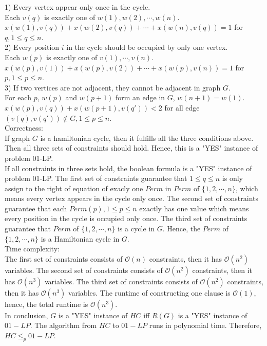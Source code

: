 \documentclass[12pt,letterpaper]{article}
\begin{document}
1) Every vertex appear only once in the cycle. \\
Each $v(q)$ is exactly one of $w(1), w(2), \cdots, w(n)$. \\
$x(w(1),v(q)) + x(w(2),v(q)) + \cdots + x(w(n),v(q)) = 1$ for $q, 1 \le q \le n$. \\
2) Every position $i$ in the cycle should be occupied by only one vertex. \\
Each $w(p)$ is exactly one of $v(1), \cdots, v(n)$. \\
$x(w(p),v(1)) + x(w(p),v(2)) + \cdots + x(w(p),v(n)) = 1$ for $p, 1 \le p \le n$. \\
3) If two vertices are not adjacent, they cannot be adjacent in graph $G$. \\
For each $p$, $w(p)$ and $w(p+1)$ form an edge in $G$, $w(n+1) = w(1)$. \\
$x(w(p),v(q)) + x(w(p+1),v(q')) < 2$ for all edge $(v(q),v(q')) \notin G, 1 \le p \le n$. \\
Correctness: \\
If graph $G$ is a hamiltonian cycle, then it fulfills all the three conditions above.
Then all three sets of constraints should hold.
Hence, this is a "YES" instance of problem 01-LP. \\
If all constraints in three sets hold, the boolean formula is a "YES" instance of problem 01-LP.
The first set of constraints guarantee that $1 \le q \le n$
is only assign to the right of equation of exacly one $Perm$ in $Perm$ of $\{1,2,\cdots,n\}$,
which means every vertex appears in the cycle only once.
The second set of constraints guarantee that each
$Perm(p), 1 \le p \le n$ exactly has one value which means every position in the cycle is occupied only once.
The third set of constraints guarantee that $Perm$ of $\{1,2,\cdots,n\}$ is a cycle in $G$.
Hence, the $Perm$ of $\{1,2,\cdots,n\}$ is a Hamiltonian cycle in $G$. \\
Time complexity: \\
The first set of constraints consists of $\mathcal{O}(n)$ constraints, then it has $\mathcal{O}(n^2)$ variables.
The second set of constraints consists of $\mathcal{O}(n^2)$ constraints, then it has $\mathcal{O}(n^3)$ variables.
The third set of constraints consists of $\mathcal{O}(n^2)$ constraints, then it has $\mathcal{O}(n^3)$ variables.
The runtime of constructing one clause is $\mathcal{O}(1)$, hence, the total runtime is $\mathcal{O}(n^3)$. \\
In conclusion, $G$ is a "YES" instance of $HC$ iff $R(G)$ is a "YES" instance of $01-LP$.
The algorithm from $HC$ to $01-LP$ runs in polynomial time.
Therefore, $HC \le_{p} 01-LP$. \\
\end{document}
